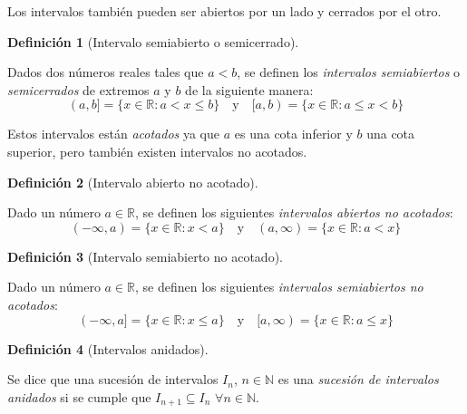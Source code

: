 \documentclass[
  a4paper,
]{scrreport}
\theoremstyle{plain}
\theoremstyle{plain}
\theoremstyle{definition}
\newtheorem{definition}{Definición}[chapter]
\theoremstyle{definition}
\theoremstyle{plain}
\theoremstyle{definition}
\theoremstyle{remark}
\begin{document}
Los intervalos también pueden ser abiertos por un lado y cerrados por el
otro.

\begin{definition}[Intervalo semiabierto o
semicerrado]\protect\hypertarget{def-intervalo-semiabierto}{}\label{def-intervalo-semiabierto}

Dados dos números reales tales que \(a<b\), se definen los
\emph{intervalos semiabiertos} o \emph{semicerrados} de extremos \(a\) y
\(b\) de la siguiente manera: \[
(a,b] = \{x\in \mathbb{R}: a< x\leq b\}\quad \mbox{y}\quad [a,b) = \{x\in \mathbb{R}: a\leq x< b\}
\]

\end{definition}

Estos intervalos están \emph{acotados} ya que \(a\) es una cota inferior
y \(b\) una cota superior, pero también existen intervalos no acotados.

\begin{definition}[Intervalo abierto no
acotado]\protect\hypertarget{def-intervalo-abierto-no-acotado}{}\label{def-intervalo-abierto-no-acotado}

Dado un número \(a\in \mathbb{R}\), se definen los siguientes
\emph{intervalos abiertos no acotados}: \[
(-\infty,a) = \{x\in \mathbb{R}: x<a\} \quad \mbox{y}\quad (a,\infty) = \{x\in \mathbb{R}: a< x\}
\]

\end{definition}

\begin{definition}[Intervalo semiabierto no
acotado]\protect\hypertarget{def-intervalo-semiabierto-no-acotado}{}\label{def-intervalo-semiabierto-no-acotado}

Dado un número \(a\in \mathbb{R}\), se definen los siguientes
\emph{intervalos semiabiertos no acotados}: \[
(-\infty,a] = \{x\in \mathbb{R}: x\leq a\} \quad \mbox{y}\quad [a,\infty) = \{x\in \mathbb{R}: a\leq x\}
\]

\end{definition}

\begin{definition}[Intervalos
anidados]\protect\hypertarget{def-intervalos-anidados}{}\label{def-intervalos-anidados}

Se dice que una sucesión de intervalos \(I_n\), \(n\in\mathbb{N}\) es
una \emph{sucesión de intervalos anidados} si se cumple que
\(I_{n+1}\subseteq I_n\) \(\forall n\in\mathbb{N}\).

\end{definition}
\end{document}
